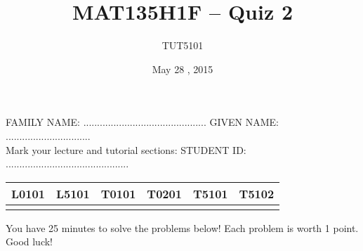 \documentclass[10pt]{article}
\title{MAT135H1F -- Quiz 2}
\author{TUT5101}
\date{May 28 , 2015}
\begin{document}
\maketitle

FAMILY NAME: ............................................. \hspace{1 cm} GIVEN NAME: ............................... \\



Mark your lecture and tutorial sections: \hspace{1 cm}  STUDENT ID: ............................................. 
\begin{center}


\begin{tabular}{*{6}{|c}|} \hline
L0101 & L5101 & T0101 & T0201 & T5101 & T5102 \\ \hline
& & & & & \\  \hline
\end{tabular}
\end{center}

You have 25 minutes to solve the problems below! Each problem is worth 1 point. Good luck!

\begin{comment}
You have 10 minutes to record your solutions in the boxes below! Good luck!

\begin{center}
\begin{tabular}{*{5}{|c}|} \hline
 Question 1. &  Question 2. & Question 3. &  Question 4. & Question 5.  \\ \hline
&&&& \\ \hline
\end{tabular}
\end{center}
\end{comment}


\vspace{0.5 cm}
\end{document}
